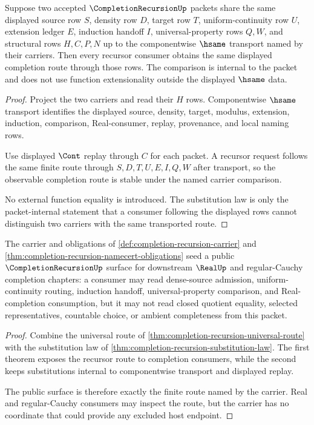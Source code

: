 \begin{theorem}
\label{thm:completion-recursion-substitution-law}
Suppose two accepted $\CompletionRecursionUp$ packets share the same displayed source row $S$, density row $D$, target row $T$, uniform-continuity row $U$, extension ledger $E$, induction handoff $I$, universal-property rows $Q,W$, and structural rows $H,C,P,N$ up to the componentwise $\hsame$ transport named by their carriers. Then every recursor consumer obtains the same displayed completion route through those rows. The comparison is internal to the packet and does not use function extensionality outside the displayed $\hsame$ data.
\end{theorem}
\begin{proof}
Project the two carriers and read their $H$ rows. Componentwise $\hsame$ transport identifies the displayed source, density, target, modulus, extension, induction, comparison, Real-consumer, replay, provenance, and local naming rows.

Use displayed $\Cont$ replay through $C$ for each packet. A recursor request follows the same finite route through $S,D,T,U,E,I,Q,W$ after transport, so the observable completion route is stable under the named carrier comparison.

No external function equality is introduced. The substitution law is only the packet-internal statement that a consumer following the displayed rows cannot distinguish two carriers with the same transported route.
\end{proof}

\begin{theorem}
\label{thm:completion-recursion-public-seed}
The carrier and obligations of \autoref{def:completion-recursion-carrier} and \autoref{thm:completion-recursion-namecert-obligations} seed a public $\CompletionRecursionUp$ surface for downstream $\RealUp$ and regular-Cauchy completion chapters: a consumer may read dense-source admission, uniform-continuity routing, induction handoff, universal-property comparison, and Real-completion consumption, but it may not read closed quotient equality, selected representatives, countable choice, or ambient completeness from this packet.
\end{theorem}
\begin{proof}
Combine the universal route of \autoref{thm:completion-recursion-universal-route} with the substitution law of \autoref{thm:completion-recursion-substitution-law}. The first theorem exposes the recursor route to completion consumers, while the second keeps substitutions internal to componentwise transport and displayed replay.

The public surface is therefore exactly the finite route named by the carrier. Real and regular-Cauchy consumers may inspect the route, but the carrier has no coordinate that could provide any excluded host endpoint.
\end{proof}

